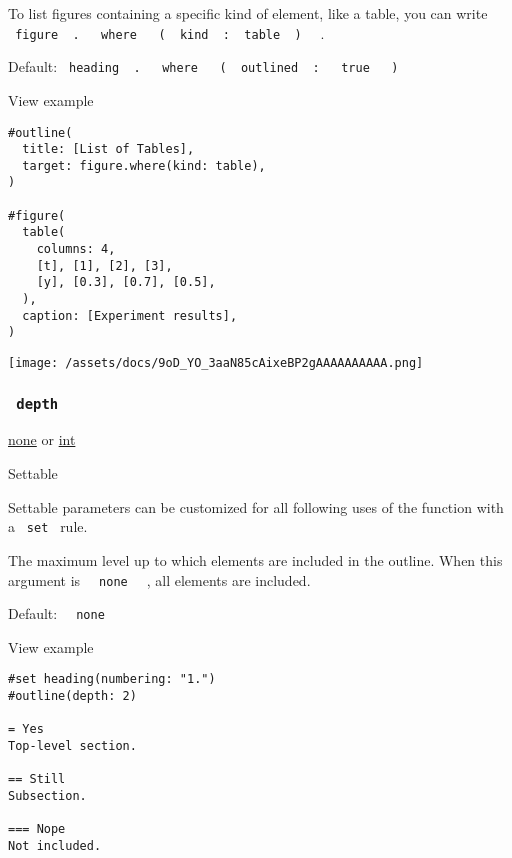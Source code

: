 To list figures containing a specific kind of element, like a table, you
can write
\texttt{\ figure\ }{\texttt{\ .\ }}\texttt{\ }{\texttt{\ where\ }}\texttt{\ }{\texttt{\ (\ }}\texttt{\ kind\ }{\texttt{\ :\ }}\texttt{\ table\ }{\texttt{\ )\ }}\texttt{\ }
.

Default:
\texttt{\ heading\ }{\texttt{\ .\ }}\texttt{\ }{\texttt{\ where\ }}\texttt{\ }{\texttt{\ (\ }}\texttt{\ outlined\ }{\texttt{\ :\ }}\texttt{\ }{\texttt{\ true\ }}\texttt{\ }{\texttt{\ )\ }}\texttt{\ }


View example

\begin{verbatim}
#outline(
  title: [List of Tables],
  target: figure.where(kind: table),
)

#figure(
  table(
    columns: 4,
    [t], [1], [2], [3],
    [y], [0.3], [0.7], [0.5],
  ),
  caption: [Experiment results],
)
\end{verbatim}

\texttt{[image: /assets/docs/9oD\_YO\_3aaN85cAixeBP2gAAAAAAAAAA.png]}

\subsubsection{\texorpdfstring{\texttt{\ depth\ }}{ depth }}\label{parameters-depth}

\href{/docs/reference/foundations/none/}{none} {or}
\href{/docs/reference/foundations/int/}{int}

{{ Settable }}

\label{parameters-depth-settable-tooltip}
Settable parameters can be customized for all following uses of the
function with a \texttt{\ set\ } rule.

The maximum level up to which elements are included in the outline. When
this argument is \texttt{\ }{\texttt{\ none\ }}\texttt{\ } , all
elements are included.

Default: \texttt{\ }{\texttt{\ none\ }}\texttt{\ }


View example

\begin{verbatim}
#set heading(numbering: "1.")
#outline(depth: 2)

= Yes
Top-level section.

== Still
Subsection.

=== Nope
Not included.
\end{verbatim}

